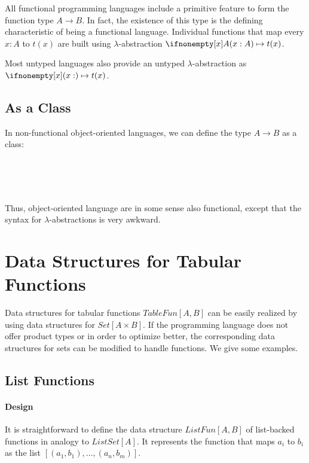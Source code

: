 All functional programming languages include a primitive feature to form the function type $A\to B$.
In fact, the existence of this type is the defining characteristic of being a functional language.
Individual functions that map every $x:A$ to $t(x)$ are built using $\lambda$-abstraction $\alam[A]{x}{t(x)}$.

Most untyped languages also provide an untyped $\lambda$-abstraction as $\alam{x}{t(x)}$.

\subsection{As a Class}

In non-functional object-oriented languages, we can define the type $A\to B$ as a class:

\begin{acode}
\\
\\
\tb{}\\
\end{acode}

Thus, object-oriented language are in some sense also functional, except that the syntax for $\lambda$-abstractions is very awkward.

\section{Data Structures for Tabular Functions}

Data structures for tabular functions $TableFun[A,B]$ can be easily realized by using data structures for $Set[A\times B]$.
If the programming language does not offer product types or in order to optimize better, the corresponding data structures for sets can be modified to handle functions.
We give some examples.

\subsection{List Functions}

\paragraph{Design}
It is straightforward to define the data structure $ListFun[A,B]$ of list-backed functions in analogy to $ListSet[A]$.
It represents the function that maps $a_i$ to $b_i$ as the list $[(a_1,b_1),\ldots,(a_n,b_m)]$.

